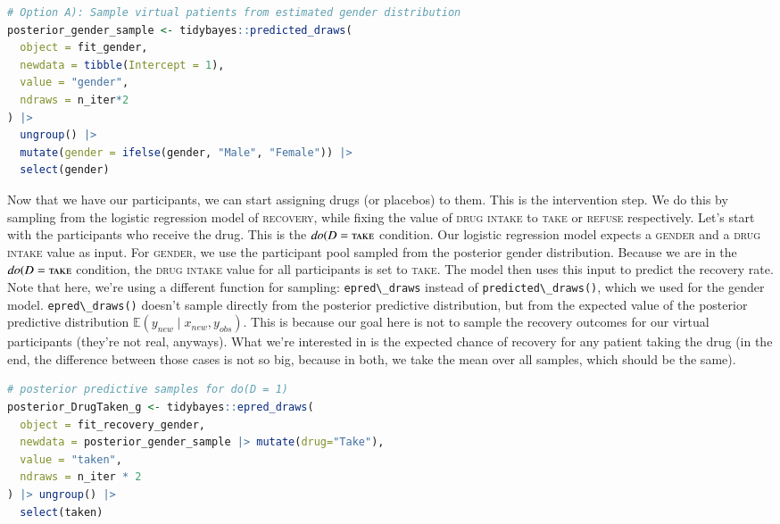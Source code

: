 \documentclass[nobib]{tufte-handout}
\newcommand{\ri}[1]{\mbox{\lstinline{#1}}\xspace}  %
\newcommand{\mathdo}{\mathit{do}}
\begin{document}
\begin{minipage}[]{\textwidth}
\begin{lstlisting}[language=R]
# Option A): Sample virtual patients from estimated gender distribution
posterior_gender_sample <- tidybayes::predicted_draws(
  object = fit_gender,
  newdata = tibble(Intercept = 1),
  value = "gender",
  ndraws = n_iter*2
) |> 
  ungroup() |>
  mutate(gender = ifelse(gender, "Male", "Female")) |>
  select(gender)
\end{lstlisting}
\end{minipage}

\vspace{-0.5cm}
Now that we have our participants, we can start assigning drugs (or placebos) to them. 
This is the intervention step. We do this by sampling from the logistic regression model of \textsc{recovery}, while fixing the value of \textsc{drug intake} to \textsc{take} or \textsc{refuse} respectively. 
Let’s start with the participants who receive the drug. 
This is the $\mathdo(D=\textsc{take}$ condition. 
Our logistic regression model expects a \textsc{gender} and a \textsc{drug intake} value as input. 
For \textsc{gender}, we use the participant pool sampled from the posterior gender distribution. 
Because we are in the $\mathdo(D=\textsc{take}$ condition, the \textsc{drug intake} value for all participants is set to \textsc{take}. 
The model then uses this input to predict the recovery rate. 
Note that here, we’re using a different function for sampling: \ri{epred\_draws} instead of \ri{predicted\_draws()}, which we used for the gender model. 
\ri{epred\_draws()} doesn’t sample directly from the posterior predictive distribution, but from the expected value of the posterior predictive distribution $\mathbb{E}(y_{new} \mid x_{new}, y_{obs})$. 
This is because our goal here is not to sample the recovery outcomes for our virtual participants (they’re not real, anyways). 
What we’re interested in is the expected chance of recovery for any patient taking the drug (in the end, the difference between those cases is not so big, because in both, we take the mean over all samples, which should be the same). 

\begin{minipage}[]{\textwidth}
\begin{lstlisting}[language=R]
# posterior predictive samples for do(D = 1)
posterior_DrugTaken_g <- tidybayes::epred_draws(
  object = fit_recovery_gender,
  newdata = posterior_gender_sample |> mutate(drug="Take"),
  value = "taken",
  ndraws = n_iter * 2
) |> ungroup() |>
  select(taken)
\end{lstlisting}
\end{minipage}
\end{document}
